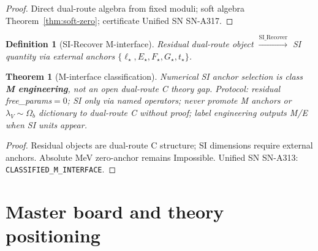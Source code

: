 \documentclass[11pt,a4paper]{article}
\newtheorem{theorem}{Theorem}
\newtheorem{definition}{Definition}
\theoremstyle{remark}
\begin{document}
\begin{proof}
Direct dual-route algebra from fixed moduli; soft algebra Theorem~\ref{thm:soft-zero}; certificate Unified SN SN-A317.
\end{proof}

\begin{definition}[SI-Recover M-interface]
\label{def:M}
Residual dual-route object $\xrightarrow{\mathrm{SI\_Recover}}$ SI quantity via external anchors $\{\ell_\star,E_\star,F_\star,G_\star,t_\star\}$.
\end{definition}

\begin{theorem}[M-interface classification]
\label{thm:M}
Numerical SI anchor selection is class \textbf{M engineering}, not an open dual-route C theory gap. Protocol: residual free\_params${=}0$; SI only via named operators; never promote M anchors or $\lambda_V{\sim}\Omega_b$ dictionary to dual-route C without proof; label engineering outputs M/E when SI units appear.
\end{theorem}

\begin{proof}
Residual objects are dual-route C structure; SI dimensions require external anchors. Absolute MeV zero-anchor remains Impossible. Unified SN SN-A313: \texttt{CLASSIFIED\_M\_INTERFACE}.
\end{proof}

\section{Master board and theory positioning}
\label{sec:master-board}
\end{document}

